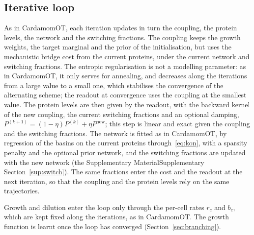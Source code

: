 \documentclass[a4paper, 11pt]{article}
\newcommand{\supref}[1]{\ifsimplified the Supplementary Material\else Supplementary Section~\ref{#1}\fi}
\theoremstyle{plain}
\theoremstyle{remark}
\begin{document}
\subsection{Iterative loop}\label{sec:loop}

As in CardamomOT, each iteration updates in turn the coupling, the protein levels, the network and the switching fractions. The coupling keeps the growth weights, the target marginal and the prior of the initialisation, but uses the mechanistic bridge cost from the current proteins, under the current network and switching fractions. The entropic regularisation is not a modelling parameter: as in CardamomOT, it only serves for annealing, and decreases along the iterations from a large value to a small one, which stabilises the convergence of the alternating scheme; the readout at convergence uses the coupling at the smallest value. The protein levels are then given by the readout, with the backward kernel of the new coupling, the current switching fractions and an optional damping, $P^{(k+1)} = (1-\eta)P^{(k)} + \eta P^{\mathrm{new}}$; this step is linear and exact given the coupling and the switching fractions. The network is fitted as in CardamomOT, by regression of the basins on the current proteins through~\eqref{eq:kon}, with a sparsity penalty and the optional prior network, and the switching fractions are updated with the new network (\supref{sup:switch}). The same fractions enter the cost and the readout at the next iteration, so that the coupling and the protein levels rely on the same trajectories.

Growth and dilution enter the loop only through the per-cell rates $r_c$ and $b_c$, which are kept fixed along the iterations, as in CardamomOT. The growth function is learnt once the loop has converged (Section~\ref{sec:branching}).
\end{document}

